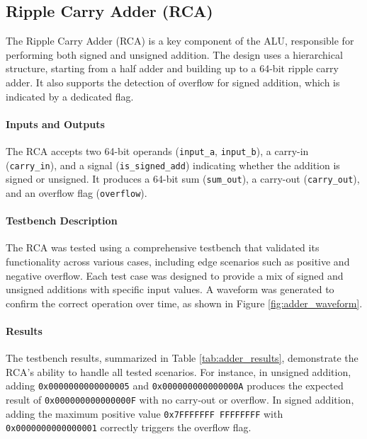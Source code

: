\documentclass[12pt]{article}
\begin{document}
\subsection*{Ripple Carry Adder (RCA)}

The Ripple Carry Adder (RCA) is a key component of the ALU, responsible for performing both signed and unsigned addition. The design uses a hierarchical structure, starting from a half adder and building up to a 64-bit ripple carry adder. It also supports the detection of overflow for signed addition, which is indicated by a dedicated flag.

\paragraph{Inputs and Outputs}
The RCA accepts two 64-bit operands (\texttt{input\_a}, \texttt{input\_b}), a carry-in (\texttt{carry\_in}), and a signal (\texttt{is\_signed\_add}) indicating whether the addition is signed or unsigned. It produces a 64-bit sum (\texttt{sum\_out}), a carry-out (\texttt{carry\_out}), and an overflow flag (\texttt{overflow}).

\paragraph{Testbench Description}
The RCA was tested using a comprehensive testbench that validated its functionality across various cases, including edge scenarios such as positive and negative overflow. Each test case was designed to provide a mix of signed and unsigned additions with specific input values. A waveform was generated to confirm the correct operation over time, as shown in Figure \ref{fig:adder_waveform}.

\paragraph{Results}
The testbench results, summarized in Table \ref{tab:adder_results}, demonstrate the RCA's ability to handle all tested scenarios. For instance, in unsigned addition, adding \texttt{0x0000000000000005} and \texttt{0x000000000000000A} produces the expected result of \texttt{0x000000000000000F} with no carry-out or overflow. In signed addition, adding the maximum positive value \texttt{0x7FFFFFFF \break FFFFFFFF} with \texttt{0x0000000000000001} correctly triggers the overflow flag.
\end{document}
